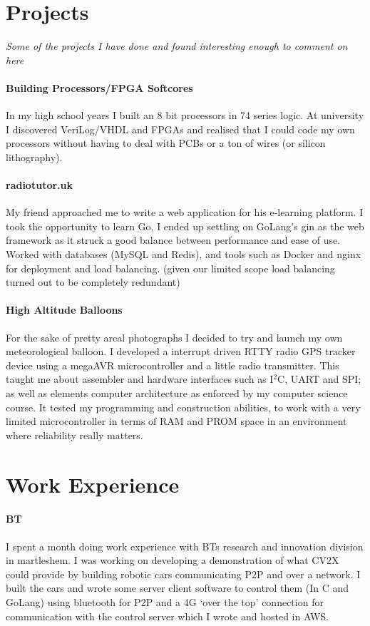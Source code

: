 \documentclass[9pt,a4paper]{article}
\begin{document}
\begin{multicols*}{2}
\section*{Projects}
\textit{Some of the projects I have done and found interesting enough to comment on here}

\paragraph{Building Processors/FPGA Softcores} In my high school years I built an 8 bit processors in 74 series logic.
At university I discovered VeriLog/VHDL and FPGAs and realised that I could code my own processors without having to deal with PCBs or a ton of wires (or silicon lithography).

\paragraph{radiotutor.uk} My friend approached me to write a web application for his e-learning platform.
I took the opportunity to learn Go, I ended up settling on GoLang's gin as the web framework as it struck a good balance between performance and ease of use.
Worked with databases (MySQL and Redis), and tools such as Docker and nginx for deployment and load balancing. (given our limited scope load balancing turned out to be completely redundant)

\paragraph{High Altitude Balloons} For the sake of pretty areal photographs I decided to try and launch my own meteorological balloon.
I developed a interrupt driven RTTY radio GPS tracker device using a megaAVR microcontroller and a little radio transmitter.
This taught me about assembler and hardware interfaces such as I$^2$C, UART and SPI;
as well as elements computer architecture as enforced by my computer science course.
It tested my programming and construction abilities, to work with a very limited microcontroller in terms of RAM and PROM space in an environment where reliability really matters.

\section*{Work Experience}

\paragraph{BT} I spent a month doing work experience with BTs research and innovation division in martleshem.
I was working on developing a demonstration of what CV2X could provide by building robotic cars communicating P2P and over a network.
I built the cars and wrote some server client software to control them (In C and GoLang) using bluetooth for P2P and a 4G `over the top' connection for communication with the control server which I wrote and hosted in AWS.


\end{multicols*}
\end{document}
